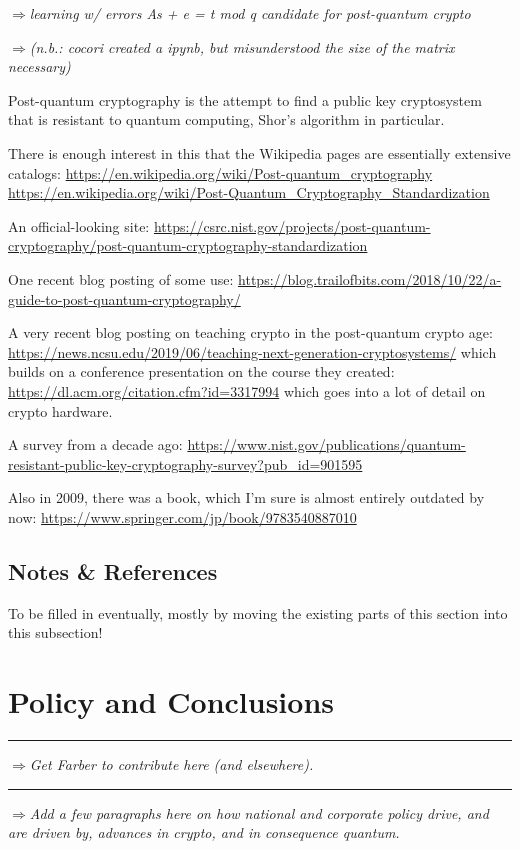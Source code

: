 \documentclass[%
 aip,
 jmp,%
 amsmath,amssymb,
 reprint,%
]{revtex4-1}
\def\outlinecomment#1{\hrule{\color{Blue}$\Rightarrow${\small\em #1}}\hrule}
\def\comment#1{{\color{ForestGreen}$\Rightarrow${\small\em #1}}}
\begin{document}
\comment{learning w/ errors As + e = t mod q
candidate for post-quantum crypto}

\comment{(n.b.: cocori created a ipynb, but misunderstood the size of the
matrix necessary)}


Post-quantum cryptography is the attempt to find a public key
cryptosystem that is resistant to quantum computing, Shor's algorithm
in particular.

There is enough interest in this that the Wikipedia pages are
essentially extensive catalogs:
\url{https://en.wikipedia.org/wiki/Post-quantum_cryptography}
\url{https://en.wikipedia.org/wiki/Post-Quantum_Cryptography_Standardization}

An official-looking site:
\url{https://csrc.nist.gov/projects/post-quantum-cryptography/post-quantum-cryptography-standardization}

One recent blog posting of some use:
\url{https://blog.trailofbits.com/2018/10/22/a-guide-to-post-quantum-cryptography/}

A very recent blog posting on teaching crypto in the post-quantum
crypto age:
\url{https://news.ncsu.edu/2019/06/teaching-next-generation-cryptosystems/}
which builds on a conference presentation on the course they created:
\url{https://dl.acm.org/citation.cfm?id=3317994}
which goes into a lot of detail on crypto hardware.

A survey from a decade ago:
\url{https://www.nist.gov/publications/quantum-resistant-public-key-cryptography-survey?pub_id=901595}

Also in 2009, there was a book, which I'm sure is almost entirely
outdated by now:
\url{https://www.springer.com/jp/book/9783540887010}

\subsection{Notes \& References}

To be filled in eventually, mostly by moving the existing parts of
this section into this subsection!

\section{Policy and Conclusions}

\outlinecomment{Get Farber to contribute here (and elsewhere).}

\comment{Add a few paragraphs here on how national and corporate
  policy drive, and are driven by, advances in crypto, and in
  consequence quantum.}
\end{document}
